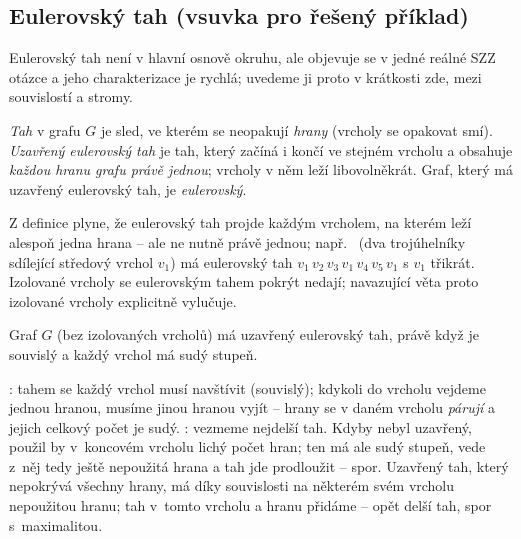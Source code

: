 \documentclass[11pt,a4paper]{article}
\begin{document}
\subsection{Eulerovský tah (vsuvka pro řešený příklad)}

Eulerovský tah není v hlavní osnově okruhu, ale objevuje se v jedné reálné SZZ otázce a jeho charakterizace je rychlá; uvedeme ji proto v krátkosti zde, mezi souvislostí a stromy.

\begin{definice}
\emph{Tah} v grafu $G$ je sled, ve kterém se neopakují \emph{hrany} (vrcholy se opakovat smí). \emph{Uzavřený eulerovský tah} je tah, který začíná i končí ve stejném vrcholu a obsahuje \emph{každou hranu grafu právě jednou}; vrcholy v něm leží libovolněkrát. Graf, který má uzavřený eulerovský tah, je \emph{eulerovský}.
\end{definice}

\begin{poznamka}
Z definice plyne, že eulerovský tah projde každým vrcholem, na kterém leží alespoň jedna hrana -- ale ne nutně právě jednou; např.\  (dva trojúhelníky sdílející středový vrchol $v_1$) má eulerovský tah $v_1\,v_2\,v_3\,v_1\,v_4\,v_5\,v_1$ s $v_1$ třikrát. Izolované vrcholy se eulerovským tahem pokrýt nedají; navazující věta proto izolované vrcholy explicitně vylučuje.
\end{poznamka}

\begin{veta}
Graf $G$ (bez izolovaných vrcholů) má uzavřený eulerovský tah, právě když je souvislý a každý vrchol má sudý stupeň.
\end{veta}

\begin{intuice}
: tahem se každý vrchol musí navštívit (souvislý); kdykoli do vrcholu vejdeme jednou hranou, musíme jinou hranou vyjít -- hrany se v daném vrcholu \emph{párují} a jejich celkový počet je sudý. : vezmeme nejdelší tah. Kdyby nebyl uzavřený, použil by v~koncovém vrcholu lichý počet hran; ten má ale sudý stupeň, vede z~něj tedy ještě nepoužitá hrana a tah jde prodloužit -- spor. Uzavřený tah, který nepokrývá všechny hrany, má díky souvislosti na některém svém vrcholu nepoužitou hranu; tah  v~tomto vrcholu a hranu přidáme -- opět delší tah, spor s~maximalitou.
\end{intuice}
\end{document}
